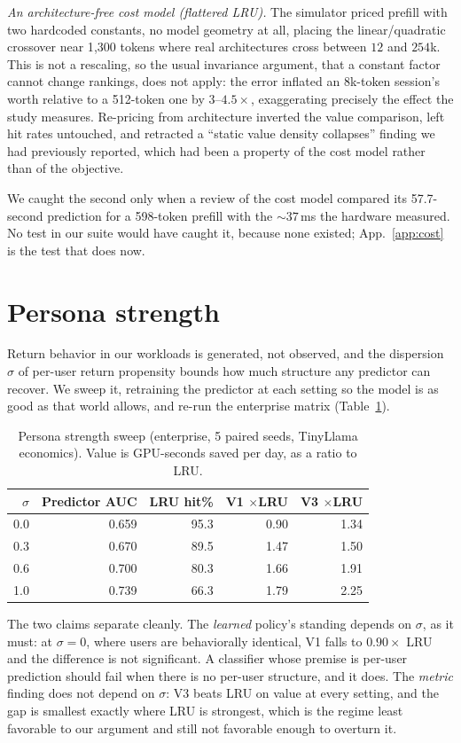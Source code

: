 \documentclass{article}
\begin{document}
\emph{An architecture-free cost model (flattered LRU).} The simulator priced prefill with
two hardcoded constants, no model geometry at all, placing the linear/quadratic crossover
near 1{,}300 tokens where real architectures cross between $12$ and $254$k. This is not a
rescaling, so the usual invariance argument, that a constant factor cannot change rankings, does not apply: the error inflated an 8k-token session's worth relative to a
512-token one by $3$--$4.5\times$, exaggerating precisely the effect the study measures.
Re-pricing from architecture inverted the value comparison, left hit rates untouched, and
retracted a ``static value density collapses'' finding we had previously reported, which
had been a property of the cost model rather than of the objective.

We caught the second only when a review of the cost model compared its 57.7-second
prediction for a 598-token prefill with the ${\sim}37$\,ms the hardware measured. No test in our suite
would have caught it, because none existed; App.~\ref{app:cost} is the test that does now.

\section{Persona strength}
\label{app:persona}

Return behavior in our workloads is generated, not observed, and the dispersion $\sigma$
of per-user return propensity bounds how much structure any predictor can recover. We
sweep it, retraining the predictor at each setting so the model is as good as that world
allows, and re-run the enterprise matrix (Table~\ref{tab:persona}).

\begin{table}[h]
\centering
\caption{Persona strength sweep (enterprise, 5 paired seeds, TinyLlama economics).
Value is GPU-seconds saved per day, as a ratio to LRU.}
\label{tab:persona}
\small
\begin{tabular}{@{}rrrrr@{}}
\toprule
$\sigma$ & Predictor AUC & LRU hit\% & V1 $\times$LRU & V3 $\times$LRU \\
\midrule
0.0 & 0.659 & 95.3 & 0.90 & 1.34 \\
0.3 & 0.670 & 89.5 & 1.47 & 1.50 \\
0.6 & 0.700 & 80.3 & 1.66 & 1.91 \\
1.0 & 0.739 & 66.3 & 1.79 & 2.25 \\
\bottomrule
\end{tabular}
\end{table}

The two claims separate cleanly. The \emph{learned} policy's standing depends on $\sigma$,
as it must: at $\sigma{=}0$, where users are behaviorally identical, V1 falls to
$0.90\times$ LRU and the difference is not significant. A classifier whose premise is
per-user prediction should fail when there is no per-user structure, and it does. The
\emph{metric} finding does not depend on $\sigma$: V3 beats LRU on value at every setting,
and the gap is smallest exactly where LRU is strongest, which is the regime least
favorable to our argument and still not favorable enough to overturn it.
\end{document}
